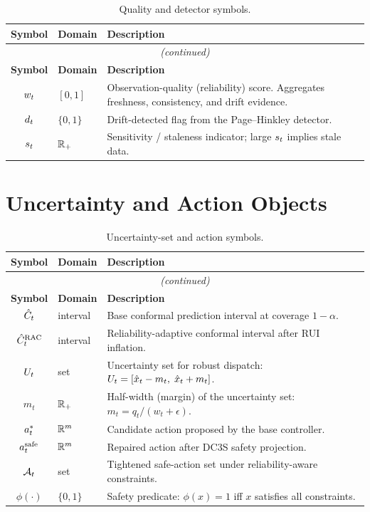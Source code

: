 \begin{longtable}{@{}clp{8.2cm}@{}}
\caption{Quality and detector symbols.}\label{tab:notation-quality}\\
\toprule
\textbf{Symbol} & \textbf{Domain} & \textbf{Description} \\
\midrule
\endfirsthead
\multicolumn{3}{c}{\emph{(continued)}}\\
\toprule \textbf{Symbol} & \textbf{Domain} & \textbf{Description} \\
\midrule
\endhead
\bottomrule
\endfoot
$w_t$  & $[0,1]$    & Observation-quality (reliability) score.  Aggregates freshness, consistency, and drift evidence. \\
$d_t$  & $\{0,1\}$  & Drift-detected flag from the Page--Hinkley detector. \\
$s_t$  & $\mathbb{R}_+$     & Sensitivity / staleness indicator; large $s_t$ implies stale data. \\
\end{longtable}

\section{Uncertainty and Action Objects}

\begin{longtable}{@{}clp{8.2cm}@{}}
\caption{Uncertainty-set and action symbols.}\label{tab:notation-action}\\
\toprule
\textbf{Symbol} & \textbf{Domain} & \textbf{Description} \\
\midrule
\endfirsthead
\multicolumn{3}{c}{\emph{(continued)}}\\
\toprule \textbf{Symbol} & \textbf{Domain} & \textbf{Description} \\
\midrule
\endhead
\bottomrule
\endfoot
$\hat{C}_t$  & interval   & Base conformal prediction interval at coverage $1-\alpha$. \\
$\hat{C}_t^{\mathrm{RAC}}$  & interval   & Reliability-adaptive conformal interval after RUI inflation. \\
$U_t$    & set        & Uncertainty set for robust dispatch: $U_t = [\hat{x}_t - m_t,\;\hat{x}_t + m_t]$. \\
$m_t$    & $\mathbb{R}_+$     & Half-width (margin) of the uncertainty set: $m_t = q_t/(w_t + \epsilon)$. \\
$a_t^{*}$ & $\mathbb{R}^m$     & Candidate action proposed by the base controller. \\
$a_t^{\mathrm{safe}}$ & $\mathbb{R}^m$     & Repaired action after DC3S safety projection. \\
$\mathcal{A}_t$  & set        & Tightened safe-action set under reliability-aware constraints. \\
$\phi(\cdot)$ & $\{0,1\}$ & Safety predicate: $\phi(x)=1$ iff $x$ satisfies all constraints. \\
\end{longtable}

